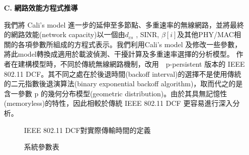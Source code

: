 \documentclass[12pt,a4paper]{article}
\begin{document}
\begin{description}
\begin{enumerate}
\item [\bf C.]{\textbf{\Kai 網路效能方程式推導 }}\\
\vspace{-2mm}

我們將 Cali's model\cite{tn00_cali} 進一步的延伸至多節點、多重速率的無線網路，並將最終的網路效能(network capacity)以一個由$d_{cs}$ , SINR, $\beta[i]$及其他PHY/MAC相關的各項參數所組成的方程式表示。我們利用Cali's model 及修改一些參數，將此model轉換成適用於載波偵測、干擾計算及多重速率選擇的分析模型。 
作者\cite{tn00_cali}在建構模型時，不同於傳統無線網路機制，改用　p-persistent 版本的 IEEE 802.11 DCF。其不同之處在於後退時間(backoff interval)的選擇不是使用傳統的二元指數後退演算法(binary exponential backoff algorithm)，取而代之的是含一參數 p 的幾何分布模型(geometric distribution)。由於其具無記憶性(memoryless)的特性，因此相較於傳統 IEEE 802.11 DCF 更容易進行深入分析。 

\begin{figure}[hbt]
\begin{center}
\caption{IEEE 802.11 DCF對實際傳輸時間的定義} \label{fig:80211dcf}
\vspace{-0.2cm}
\end{center}
\end{figure}

\begin{figure}[hbt]
\begin{center}
\caption{系統參數表} \label{fig:sys_parameters}
\vspace{-0.2cm}
\end{center}
\end{figure}


\end{enumerate}
\end{description}
\end{document}

